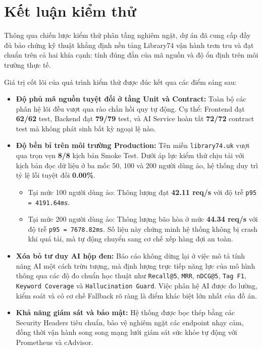 \section{Kết luận kiểm thử}

Thông qua chiến lược kiểm thử phân tầng nghiêm ngặt, dự án đã cung cấp đầy đủ bảo chứng kỹ thuật khẳng định nền tảng Library74 vận hành trơn tru và đạt chuẩn trên cả hai khía cạnh: tính đúng đắn của mã nguồn và độ ổn định trên môi trường thực tế.

Giá trị cốt lõi của quá trình kiểm thử được đúc kết qua các điểm sáng sau:

\begin{itemize}
    \item \textbf{Độ phủ mã nguồn tuyệt đối ở tầng Unit và Contract:} Toàn bộ các phân hệ lõi đều vượt qua rào chắn hồi quy tự động. Cụ thể: Frontend đạt \textbf{62/62} test, Backend đạt \textbf{79/79} test, và AI Service hoàn tất \textbf{72/72} contract test mà không phát sinh bất kỳ ngoại lệ nào.

    \item \textbf{Độ bền bỉ trên môi trường Production:} Tên miền \texttt{library74.uk} vượt qua trọn vẹn \textbf{8/8} kịch bản Smoke Test. Dưới áp lực kiểm thử chịu tải với kịch bản đọc dữ liệu ở ba mốc 50, 100 và 200 người dùng ảo, hệ thống duy trì tỷ lệ lỗi tuyệt đối \textbf{0.00\%}.
    \begin{itemize}
        \item Tại mức 100 người dùng ảo: Thông lượng đạt \textbf{42.11 req/s} với độ trễ \texttt{p95 = 4191.64ms}.
        \item Tại mức 200 người dùng ảo: Thông lượng bão hòa ở mức \textbf{44.34 req/s} với độ trễ \texttt{p95 = 7678.82ms}. Số liệu này chứng minh hệ thống không bị crash khi quá tải, mà tự động chuyển sang cơ chế xếp hàng đợi an toàn.
    \end{itemize}

    \item \textbf{Xóa bỏ tư duy AI hộp đen:} Báo cáo không dừng lại ở việc mô tả tính năng AI một cách trừu tượng, mà định lượng trực tiếp năng lực của mô hình thông qua các độ đo chuẩn học thuật như \texttt{Recall@5}, \texttt{MRR}, \texttt{nDCG@5}, \texttt{Tag F1}, \texttt{Keyword Coverage} và \texttt{Hallucination Guard}. Việc phân hệ AI được đo lường, kiểm soát và có cơ chế Fallback rõ ràng là điểm khác biệt lớn nhất của đồ án.

    \item \textbf{Khả năng giám sát và bảo mật:} Hệ thống được bọc thép bằng các Security Headers tiêu chuẩn, bảo vệ nghiêm ngặt các endpoint nhạy cảm, đồng thời vận hành song song mạng lưới giám sát sức khỏe tự động với Prometheus và cAdvisor.
\end{itemize}

